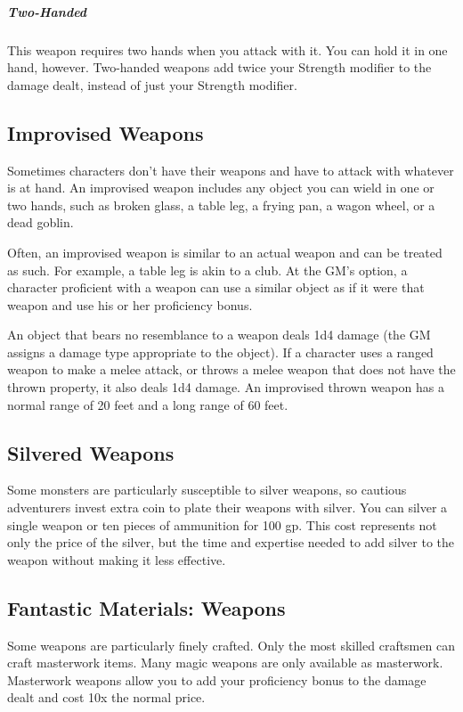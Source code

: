 \subparagraph*{Two-Handed} This weapon requires two hands when you attack with it. You can hold it in one hand, however. Two-handed weapons add twice your Strength modifier to the damage dealt, instead of just your Strength modifier.

\subsection{Improvised Weapons}

Sometimes characters don't have their weapons and have to attack with whatever is at hand. An improvised weapon includes any object you can wield in one or two hands, such as broken glass, a table leg, a frying pan, a wagon wheel, or a dead goblin.

Often, an improvised weapon is similar to an actual weapon and can be treated as such. For example, a table leg is akin to a club. At the GM's option, a character proficient with a weapon can use a similar object as if it were that weapon and use his or her proficiency bonus.

An object that bears no resemblance to a weapon deals 1d4 damage (the GM assigns a damage type appropriate to the object). If a character uses a ranged weapon to make a melee attack, or throws a melee weapon that does not have the thrown property, it also deals 1d4 damage. An improvised thrown weapon has a normal range of 20 feet and a long range of 60 feet.

\subsection{Silvered Weapons}

Some monsters are particularly susceptible to silver weapons, so cautious adventurers invest extra coin to plate their weapons with silver. You can silver a single weapon or ten pieces of ammunition for 100 gp. This cost represents not only the price of the silver, but the time and expertise needed to add silver to the weapon without making it less effective.

\subsection{Fantastic Materials: Weapons}
Some weapons are particularly finely crafted. Only the most skilled craftsmen can craft masterwork items. Many magic weapons are only available as masterwork. Masterwork weapons allow you to add your proficiency bonus to the damage dealt and cost 10x the normal price.

